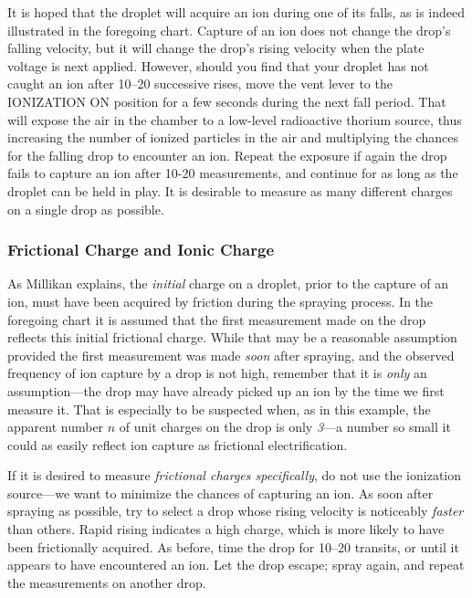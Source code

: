 It is hoped that the droplet will acquire an ion during one of its
falls, as is indeed illustrated in the foregoing
chart. Capture of an ion does not change the drop's falling velocity,
but it will change the drop's rising velocity when the plate voltage is
next applied. However, should you find that your droplet has not caught
an ion after 10--20 successive rises, move the vent lever to the
IONIZATION ON position for a few seconds during the next fall period.
That will expose the air in the chamber to a low-level radioactive
thorium source, thus increasing the number of ionized particles in the
air and multiplying the chances for the falling drop to encounter an
ion. Repeat the exposure if again the drop fails to capture an ion after
10-20 measurements, and continue for as long as the droplet can be held
in play. It is desirable to measure as many different charges on a
single drop as possible.

\subsubsection*{Frictional Charge and Ionic Charge}

As Millikan explains, the \emph{initial} charge on a droplet, prior to
the capture of an ion, must have been acquired by friction during the
spraying process. In the foregoing chart it is assumed that the first
measurement made on the drop reflects this initial frictional charge.
While that may be a reasonable assumption provided the first measurement
was made \emph{soon} after spraying, and the observed frequency of ion
capture by a drop is not high, remember that it is \emph{only} an
assumption---the drop may have already picked up an ion by the time we
first measure it. That is especially to be suspected when, as in this
example, the apparent number $n$ of unit charges on the drop is
only \emph{3}---a number so small it could as easily reflect ion capture
as frictional electrification.

If it is desired to measure \emph{frictional charges specifically}, do
not use the ionization source---we want to minimize the chances of
capturing an ion. As soon after spraying as possible, try to select a
drop whose rising velocity is noticeably \emph{faster} than others.
Rapid rising indicates a high charge, which is more likely to have been
frictionally acquired. As before, time the drop for 10--20 transits, or
until it appears to have en\-coun\-tered an ion. Let the drop escape; spray
again, and repeat the measurements on another drop.

